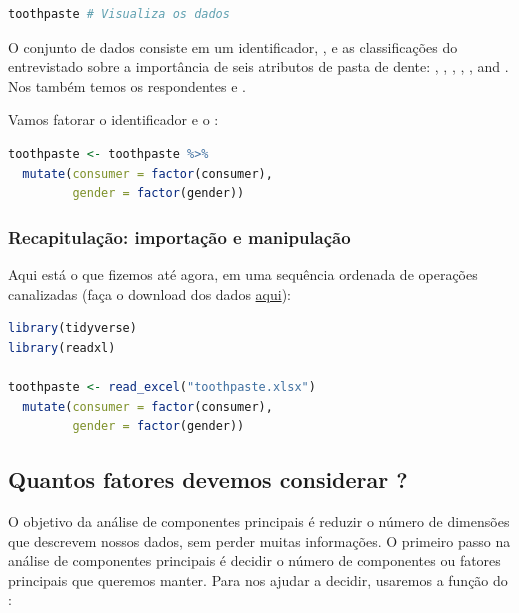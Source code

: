 \documentclass{article}
\begin{document}
\begin{lstlisting}[language=R]
toothpaste # Visualiza os dados
\end{lstlisting}

O conjunto de dados consiste em um identificador, , e as classificações do entrevistado sobre a importância de seis atributos de pasta de dente: , , , , , and . Nos também temos os respondentes  e .

Vamos fatorar o identificador e o :
\begin{lstlisting}[language=R]
toothpaste <- toothpaste %>% 
  mutate(consumer = factor(consumer),
         gender = factor(gender))
\end{lstlisting}

\subsubsection{Recapitulação: importação e manipulação}

Aqui está o que fizemos até agora, em uma sequência ordenada de operações canalizadas (faça o download dos dados \href{http://users.telenet.be/samuelfranssens/tutorial_data/toothpaste.xlsx}{aqui}):

\begin{lstlisting}[language=R]
library(tidyverse)
library(readxl)

toothpaste <- read_excel("toothpaste.xlsx")
  mutate(consumer = factor(consumer),
         gender = factor(gender))
\end{lstlisting}


\subsection{Quantos fatores devemos considerar ?}

O objetivo da análise de componentes principais é reduzir o número de dimensões que descrevem nossos dados, sem perder muitas informações. O primeiro passo na análise de componentes principais é decidir o número de componentes ou fatores principais que queremos manter. Para nos ajudar a decidir, usaremos a função  do :
\end{document}
